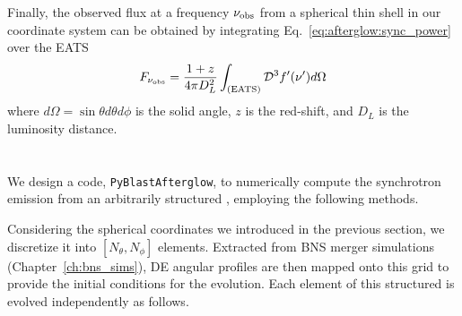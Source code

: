 Finally, the observed flux at a frequency $\nu_{\rm obs}$ from a spherical thin shell
in our coordinate system can be obtained by integrating 
Eq.~\eqref{eq:afterglow:sync_power} over the \ac{EATS} 
\begin{equation}
    F_{\nu_{\rm obs}} = \frac{1+z}{4\pi D_L^2} \int_{\rm (EATS)} \mathcal{D}^3 f'(\nu') d\Omega
    \label{eq:afterglow:sync_power_obs}
\end{equation}
where $d\Omega = \sin\theta d\theta d\phi$ is the solid angle, $z$ is the red-shift, and
$D_L$ is the luminosity distance. 



\section{\pyblast{}}\label{sec:afterglow:code}

\def\eq{\text{equation}}
\def\eqs{\text{equations}}


We design a code, \texttt{PyBlastAfterglow}, to numerically compute 
the synchrotron emission from an arbitrarily  structured \blast{}, employing 
the following methods.

Considering the spherical coordinates we introduced in the previous section, 
we discretize it into $[N_{\theta},N_{\phi}]$ elements.
%
Extracted from \ac{BNS} merger simulations (Chapter~\ref{ch:bns_sims}), 
\ac{DE} angular profiles are then mapped onto this grid to provide the 
initial conditions for the evolution. 
%
Each element of this structured \blast{} is evolved independently 
as follows. 

